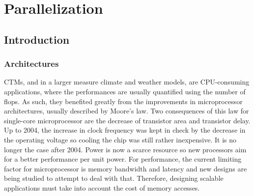 \chapter{Parallelization}
\label{chap:parallel}


\section{Introduction}
\subsection{Architectures}
\label{subsec:architectures}
\glspl{CTM}, and in a larger measure climate and weather models, are
CPU-consuming applications, where the performances are usually quantified using
the number of \gls{flops}. As such, they benefited greatly from the improvements
in microprocessor architectures, usually described by Moore's law. Two
consequences of this law for single-core microprocessor are the decrease of
transistor area and transistor delay. Up to 2004, the increase in clock
frequency was kept in check by the decrease in the operating voltage so cooling
the chip was still rather inexpensive. It is no longer the case after 2004. 
Power is now a scarce resource so new processors aim for a better performance
per unit power. For performance, the current limiting factor for microprocessor
is memory bandwidth and latency and new designs are being studied to attempt to
deal with that.  Therefore, designing scalable applications must take into
account the cost of memory accesses.

